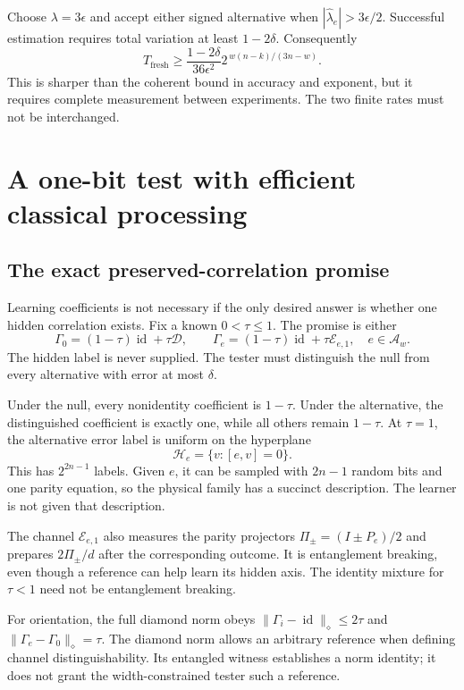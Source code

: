\documentclass[11pt,a4paper]{article}
\numberwithin{equation}{section}
\theoremstyle{definition}
\theoremstyle{remark}
\newcommand{\Dep}{\mathcal D}
\begin{document}
Choose \(\lambda=3\epsilon\) and accept either signed alternative when
\(|\widehat\lambda_e|>3\epsilon/2\). Successful estimation requires total variation at least \(1-2\delta\). Consequently
\begin{equation}
 \boxed{T_{\mathrm{fresh}}\geq
 \frac{1-2\delta}{36\epsilon^2}
 2^{\,w(n-k)/(3n-w)}.}
 \label{eq:plmt-fresh-lower}
\end{equation}
This is sharper than the coherent bound in accuracy and exponent, but it requires complete measurement between experiments. The two finite rates must not be interchanged.

\section{A one-bit test with efficient classical processing}
\subsection{The exact preserved-correlation promise}
Learning coefficients is not necessary if the only desired answer is whether one hidden correlation exists. Fix a known \(0<\tau\leq1\). The promise is either
\begin{equation}
 \Gamma_0=(1-\tau)\operatorname{id}+\tau\Dep,
 \qquad
 \Gamma_e=(1-\tau)\operatorname{id}+\tau\mathcal E_{e,1},
 \quad e\in\mathcal A_w.
 \label{eq:plmt-detect-promise}
\end{equation}
The hidden label is never supplied. The tester must distinguish the null from every alternative with error at most \(\delta\).

Under the null, every nonidentity coefficient is \(1-\tau\). Under the alternative, the distinguished coefficient is exactly one, while all others remain \(1-\tau\). At \(\tau=1\), the alternative error label is uniform on the hyperplane
\[
 \mathcal H_e=\{v:[e,v]=0\}.
\]
This has \(2^{2n-1}\) labels. Given \(e\), it can be sampled with \(2n-1\) random bits and one parity equation, so the physical family has a succinct description. The learner is not given that description.

The channel \(\mathcal E_{e,1}\) also measures the parity projectors
\(\Pi_\pm=(I\pm P_e)/2\) and prepares \(2\Pi_\pm/d\) after the corresponding outcome. It is entanglement breaking, even though a reference can help learn its hidden axis. The identity mixture for \(\tau<1\) need not be entanglement breaking.

For orientation, the full diamond norm obeys
\(\|\Gamma_i-\operatorname{id}\|_\diamond\leq2\tau\) and
\(\|\Gamma_e-\Gamma_0\|_\diamond=\tau\). The diamond norm allows an arbitrary reference when defining channel distinguishability. Its entangled witness establishes a norm identity; it does not grant the width-constrained tester such a reference.
\end{document}
